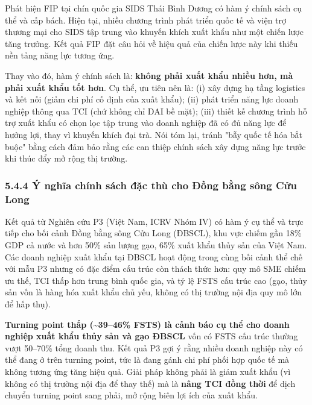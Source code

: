 \documentclass[12pt,a4paper]{article}
\begin{document}
Phát hiện FIP tại chín quốc gia SIDS Thái Bình Dương có hàm ý chính sách
cụ thể và cấp bách. Hiện tại, nhiều chương trình phát triển quốc tế và
viện trợ thương mại cho SIDS tập trung vào khuyến khích xuất khẩu như
một chiến lược tăng trưởng. Kết quả FIP đặt câu hỏi về hiệu quả của
chiến lược này khi thiếu nền tảng năng lực tương ứng.

Thay vào đó, hàm ý chính sách là: \textbf{không phải xuất khẩu nhiều
hơn, mà phải xuất khẩu tốt hơn}. Cụ thể, ưu tiên nên là: (i) xây dựng hạ
tầng logistics và kết nối (giảm chi phí cố định của xuất khẩu); (ii)
phát triển năng lực doanh nghiệp thông qua TCI (chứ không chỉ DAI bề
mặt); (iii) thiết kế chương trình hỗ trợ xuất khẩu có chọn lọc tập trung
vào doanh nghiệp đã có đủ năng lực để hưởng lợi, thay vì khuyến khích
đại trà. Nói tóm lại, tránh "bẫy quốc tế hóa bắt buộc" bằng cách đảm bảo
rằng các can thiệp chính sách xây dựng năng lực trước khi thúc đẩy mở
rộng thị trường.

\hypertarget{544-uxfd-nghux129a-chuxednh-suxe1ch-ux111ux1eb7c-thuxf9-cho-ux111ux1ed3ng-bux1eb1ng-suxf4ng-cux1eedu-long}{%
\subsubsection{5.4.4 Ý nghĩa chính sách đặc thù cho Đồng bằng sông Cửu
Long}\label{544-uxfd-nghux129a-chuxednh-suxe1ch-ux111ux1eb7c-thuxf9-cho-ux111ux1ed3ng-bux1eb1ng-suxf4ng-cux1eedu-long}}

Kết quả từ Nghiên cứu P3 (Việt Nam, ICRV Nhóm IV) có hàm ý cụ thể và
trực tiếp cho bối cảnh Đồng bằng sông Cửu Long (ĐBSCL), khu vực chiếm
gần 18\% GDP cả nước và hơn 50\% sản lượng gạo, 65\% xuất khẩu thủy sản
của Việt Nam. Các doanh nghiệp xuất khẩu tại ĐBSCL hoạt động trong cùng
bối cảnh thể chế với mẫu P3 nhưng có đặc điểm cấu trúc còn thách thức
hơn: quy mô SME chiếm ưu thế, TCI thấp hơn trung bình quốc gia, và tỷ lệ
FSTS cấu trúc cao (gạo, thủy sản vốn là hàng hóa xuất khẩu chủ yếu,
không có thị trường nội địa quy mô lớn để hấp thụ).

\textbf{Turning point thấp (\textasciitilde39--46\% FSTS) là cảnh báo cụ
thể cho doanh nghiệp xuất khẩu thủy sản và gạo ĐBSCL} vốn có FSTS cấu
trúc thường vượt 50--70\% tổng doanh thu. Kết quả P3 gợi ý rằng nhiều
doanh nghiệp này có thể đang ở trên turning point, tức là đang gánh chi
phí phối hợp quốc tế mà không tương ứng tăng hiệu quả. Giải pháp không
phải là giảm xuất khẩu (vì không có thị trường nội địa để thay thế) mà
là \textbf{nâng TCI đồng thời} để dịch chuyển turning point sang phải,
mở rộng biên lợi ích của xuất khẩu.
\end{document}
